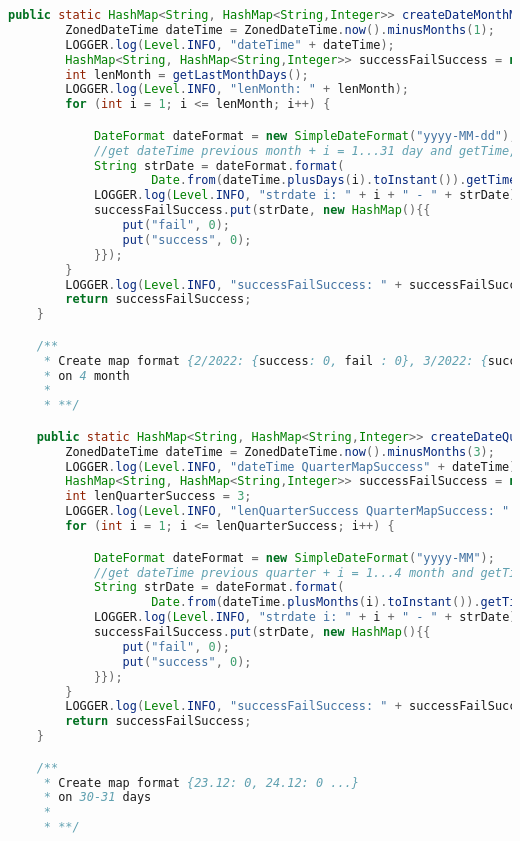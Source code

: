 \begin{lstlisting}[language=Java]
    public static HashMap<String, HashMap<String,Integer>> createDateMonthMapSuccessRate() {
        ZonedDateTime dateTime = ZonedDateTime.now().minusMonths(1);
        LOGGER.log(Level.INFO, "dateTime" + dateTime);
        HashMap<String, HashMap<String,Integer>> successFailSuccess = new HashMap();
        int lenMonth = getLastMonthDays();
        LOGGER.log(Level.INFO, "lenMonth: " + lenMonth);
        for (int i = 1; i <= lenMonth; i++) {

            DateFormat dateFormat = new SimpleDateFormat("yyyy-MM-dd");
            //get dateTime previous month + i = 1...31 day and getTime, after in strDate=2022-03-22
            String strDate = dateFormat.format(
                    Date.from(dateTime.plusDays(i).toInstant()).getTime());
            LOGGER.log(Level.INFO, "strdate i: " + i + " - " + strDate);
            successFailSuccess.put(strDate, new HashMap(){{
                put("fail", 0);
                put("success", 0);
            }});
        }
        LOGGER.log(Level.INFO, "successFailSuccess: " + successFailSuccess.entrySet());
        return successFailSuccess;
    }

    /**
     * Create map format {2/2022: {success: 0, fail : 0}, 3/2022: {success: 0, fail : 0} ...}
     * on 4 month
     *
     * **/

    public static HashMap<String, HashMap<String,Integer>> createDateQuarterMapSuccessRate() {
        ZonedDateTime dateTime = ZonedDateTime.now().minusMonths(3);
        LOGGER.log(Level.INFO, "dateTime QuarterMapSuccess" + dateTime);
        HashMap<String, HashMap<String,Integer>> successFailSuccess = new HashMap();
        int lenQuarterSuccess = 3;
        LOGGER.log(Level.INFO, "lenQuarterSuccess QuarterMapSuccess: " + lenQuarterSuccess);
        for (int i = 1; i <= lenQuarterSuccess; i++) {

            DateFormat dateFormat = new SimpleDateFormat("yyyy-MM");
            //get dateTime previous quarter + i = 1...4 month and getTime, after in strDate=2022-03
            String strDate = dateFormat.format(
                    Date.from(dateTime.plusMonths(i).toInstant()).getTime());
            LOGGER.log(Level.INFO, "strdate i: " + i + " - " + strDate);
            successFailSuccess.put(strDate, new HashMap(){{
                put("fail", 0);
                put("success", 0);
            }});
        }
        LOGGER.log(Level.INFO, "successFailSuccess: " + successFailSuccess.entrySet());
        return successFailSuccess;
    }

    /**
     * Create map format {23.12: 0, 24.12: 0 ...}
     * on 30-31 days
     *
     * **/


\end{lstlisting}
